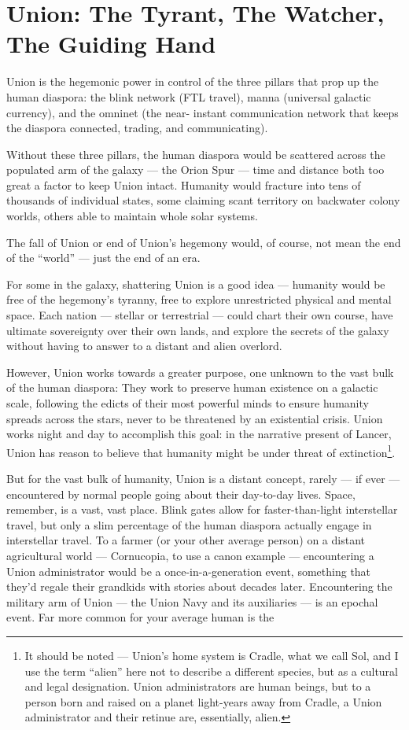 \section{Union: The Tyrant, The Watcher, The Guiding Hand}

Union is the hegemonic power in control of the three pillars that prop up the human diaspora:
the blink network (FTL travel), manna (universal galactic currency), and the omninet (the near-
instant communication network that keeps the diaspora connected, trading, and
communicating).

Without these three pillars, the human diaspora would be scattered across the populated arm of
the galaxy — the Orion Spur — time and distance both too great a factor to keep Union intact.
Humanity would fracture into tens of thousands of individual states, some claiming scant territory
on backwater colony worlds, others able to maintain whole solar systems.

The fall of Union or end of Union’s hegemony would, of course, not mean the end of the “world”
— just the end of an era.

For some in the galaxy, shattering Union is a good idea — humanity would be free of the
hegemony’s tyranny, free to explore unrestricted physical and mental space. Each nation —
stellar or terrestrial — could chart their own course, have ultimate sovereignty over their own
lands, and explore the secrets of the galaxy without having to answer to a distant and alien
overlord.

However, Union works towards a greater purpose, one unknown to the vast bulk of the human
diaspora: They work to preserve human existence on a galactic scale, following the edicts of
their most powerful minds to ensure humanity spreads across the stars, never to be threatened
by an existential crisis. Union works night and day to accomplish this goal: in the narrative
present of Lancer, Union has reason to believe that humanity might be under threat of
extinction\footnote{It should be noted — Union’s home system is Cradle, what we call Sol, and I use the term “alien” here
not to describe a different species, but as a cultural and legal designation. Union administrators are human
beings, but to a person born and raised on a planet light-years away from Cradle, a Union administrator
and their retinue are, essentially, alien.}.

But for the vast bulk of humanity, Union is a distant concept, rarely — if ever — encountered by
normal people going about their day-to-day lives. Space, remember, is a vast, vast place. Blink
gates allow for faster-than-light interstellar travel, but only a slim percentage of the human
diaspora actually engage in interstellar travel. To a farmer (or your other average person) on a
distant agricultural world — Cornucopia, to use a canon example — encountering a Union
administrator would be a once-in-a-generation event, something that they’d regale their
grandkids with stories about decades later. Encountering the military arm of Union — the Union
Navy and its auxiliaries — is an epochal event. Far more common for your average human is the



